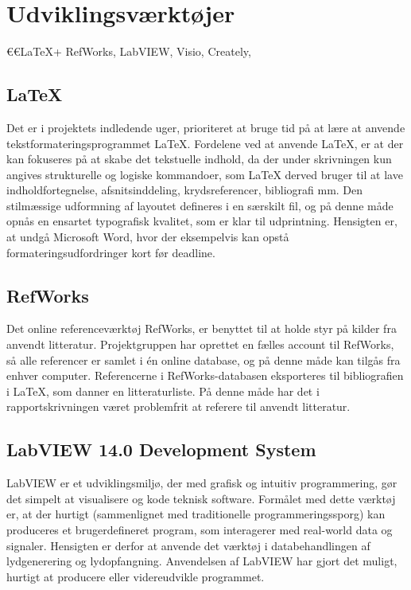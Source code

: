 \section{Udviklingsværktøjer}
	€€LaTeX+ RefWorks, LabVIEW, Visio, Creately, 

	\subsection{\LaTeX}
	
Det er i projektets indledende uger, prioriteret at bruge tid på at lære at anvende tekstformateringsprogrammet \LaTeX. Fordelene ved at anvende LaTeX, er at der kan fokuseres på at skabe det tekstuelle indhold, da der under skrivningen kun angives strukturelle og logiske kommandoer, som LaTeX derved bruger til at lave indholdfortegnelse, afsnitsinddeling, krydsreferencer, bibliografi mm. Den stilmæssige udformning af layoutet defineres i en særskilt fil, og på denne måde opnås en ensartet typografisk kvalitet, som er klar til udprintning. Hensigten er, at undgå Microsoft Word, hvor der eksempelvis kan opstå formateringsudfordringer kort før deadline. 	
	
	\subsection{RefWorks}
Det online referenceværktøj RefWorks, er benyttet til at holde styr på kilder fra anvendt litteratur. Projektgruppen har oprettet en fælles account til RefWorks, så alle referencer er samlet i én online database, og på denne måde kan tilgås fra enhver computer. Referencerne i RefWorks-databasen eksporteres til bibliografien i LaTeX, som danner en litteraturliste. På denne måde har det i rapportskrivningen været problemfrit at referere til anvendt litteratur.

	\subsection{LabVIEW 14.0 Development System}
	\label{subsec:labview}
	LabVIEW er et udviklingsmiljø, der med grafisk og intuitiv programmering, gør det simpelt at visualisere og kode teknisk software. Formålet med dette værktøj er, at der hurtigt (sammenlignet med traditionelle programmeringssporg) kan produceres et brugerdefineret program, som interagerer med real-world data og signaler. Hensigten er derfor at anvende det værktøj i databehandlingen af lydgenerering og lydopfangning. Anvendelsen af LabVIEW har gjort det muligt, hurtigt at producere eller videreudvikle programmet.   
	
